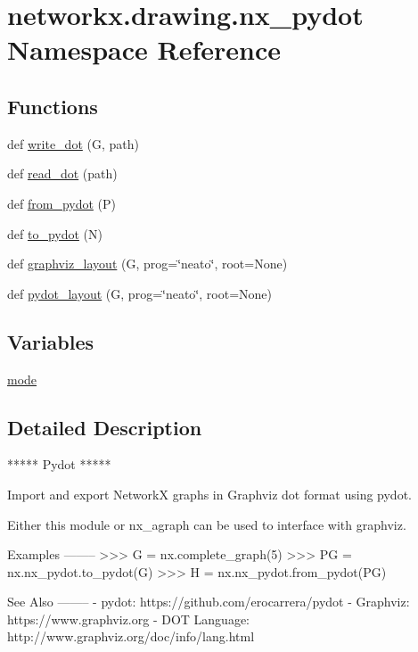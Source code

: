 \hypertarget{namespacenetworkx_1_1drawing_1_1nx__pydot}{}\section{networkx.\+drawing.\+nx\+\_\+pydot Namespace Reference}
\label{namespacenetworkx_1_1drawing_1_1nx__pydot}
\subsection*{Functions}
\begin{DoxyCompactItemize}
\item 
def \hyperlink{namespacenetworkx_1_1drawing_1_1nx__pydot_a857e86b9a44cfa838d5a32dfd8afb9fd}{write\+\_\+dot} (G, path)
\item 
def \hyperlink{namespacenetworkx_1_1drawing_1_1nx__pydot_a6522bbd2c34cdfa0497f7c21f33eaeca}{read\+\_\+dot} (path)
\item 
def \hyperlink{namespacenetworkx_1_1drawing_1_1nx__pydot_a3384bfb7e6bb5ebb35a2dae9ecf97994}{from\+\_\+pydot} (P)
\item 
def \hyperlink{namespacenetworkx_1_1drawing_1_1nx__pydot_a4241b8bd9ba6c83dda07fed169a1ef6e}{to\+\_\+pydot} (N)
\item 
def \hyperlink{namespacenetworkx_1_1drawing_1_1nx__pydot_ad4e6130de869e7cfbccbc1bbe9bc72e1}{graphviz\+\_\+layout} (G, prog=\char`\"{}neato\char`\"{}, root=None)
\item 
def \hyperlink{namespacenetworkx_1_1drawing_1_1nx__pydot_a3f26b8104d7ff44aefb4f8c47126c9e8}{pydot\+\_\+layout} (G, prog=\char`\"{}neato\char`\"{}, root=None)
\end{DoxyCompactItemize}
\subsection*{Variables}
\begin{DoxyCompactItemize}
\item 
\hyperlink{namespacenetworkx_1_1drawing_1_1nx__pydot_a492e7db939cfb2e188cadd1e7c79bb2b}{mode}
\end{DoxyCompactItemize}


\subsection{Detailed Description}
\begin{DoxyVerb}*****
Pydot
*****

Import and export NetworkX graphs in Graphviz dot format using pydot.

Either this module or nx_agraph can be used to interface with graphviz.

Examples
--------
>>> G = nx.complete_graph(5)
>>> PG = nx.nx_pydot.to_pydot(G)
>>> H = nx.nx_pydot.from_pydot(PG)

See Also
--------
 - pydot:         https://github.com/erocarrera/pydot
 - Graphviz:      https://www.graphviz.org
 - DOT Language:  http://www.graphviz.org/doc/info/lang.html
\end{DoxyVerb}
 

